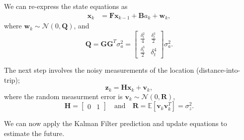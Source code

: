 \documentclass[11pt]{article}
\begin{document}
We can re-express the state equations as
\begin{align}
  \label{eq:state_matrix_eqns2}
  \mathbf{x}_k &= \mathbf{F} \mathbf{x}_{k-1} + \mathbf{B} a_k + \mathbf{w}_k,
\end{align}
where $\mathbf{w}_k \sim \mathcal{N}\left(0,\mathbf{Q}\right)$, and
\begin{equation}
  \label{eq:systm_variance}
  \mathbf{Q} = \mathbf{G} \mathbf{G}^T \sigma_a^2
  =
  \begin{bmatrix}
    \frac{\delta_t^2}{4} & \frac{\delta_t^3}{2} \\
    \frac{\delta_t^3}{2} & \delta_t^4
  \end{bmatrix} \sigma_a^2.
\end{equation}



The next step involves the noisy measurements of the location (distance-into-trip);
\begin{equation}
  \label{eq:measurements}
  \mathbf{z}_k = \mathbf{H}\mathbf{x}_k + \mathbf{v}_k,
\end{equation}
where the random measurment error is $\mathbf{v}_k \sim \mathcal{N}\left(0, \mathbf{R}\right)$,
\begin{equation}
  \label{eq:moremats}
  \mathbf{H} =
  \begin{bmatrix}
    0 & 1
  \end{bmatrix}
  \quad \text{and} \quad \mathbf{R} = \mathbb{E}\left[\mathbf{v}_k \mathbf{v}_k^T\right] = \sigma_z^2.
\end{equation}


We can now apply the Kalman Filter prediction and update equations to estimate the future.
\end{document}
